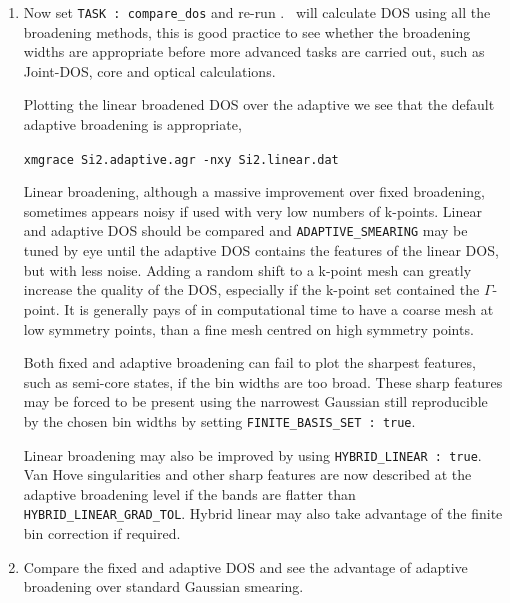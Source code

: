 \documentclass[a4paper,11pt,twoside]{book}
\begin{document}
{\begin{enumerate}
Increasing the number of integration points has improved the band energy of the adaptive smearing:
\begin{verbatim}
|          Band energy (Adaptive broadening) :       1.3623 eV         <- BEA |
\end{verbatim}


\item  Now set {\tt TASK : compare\_dos} and re-run \optados. \optados\ will calculate DOS using all the broadening methods, this is good practice to see whether the broadening widths are appropriate before more advanced tasks are carried out, such as Joint-DOS, core and optical calculations.

Plotting the linear broadened DOS over the adaptive we see that the default adaptive broadening is appropriate,

\verb#xmgrace Si2.adaptive.agr -nxy Si2.linear.dat#

Linear broadening, although a massive improvement over fixed broadening, sometimes appears noisy if used with very low numbers of k-points. Linear and adaptive DOS should be compared and \verb#ADAPTIVE_SMEARING# may be tuned by eye until the adaptive DOS contains the features of the linear DOS, but with less noise.  Adding a random shift to a k-point mesh can greatly increase the quality of the DOS, especially if the k-point set contained the $\Gamma$-point. It is generally pays of in computational time to have a coarse mesh at low symmetry points, than a fine mesh centred on high symmetry points. 

Both fixed and adaptive broadening can fail to plot the sharpest features, such as semi-core states, if the bin widths are too broad. These sharp features may be forced to be present using the narrowest Gaussian still reproducible by the chosen bin widths by setting \verb#FINITE_BASIS_SET : true#.  

Linear broadening may also be improved by using \verb#HYBRID_LINEAR : true#. Van Hove singularities and other sharp features are now described at the adaptive broadening level if the bands are flatter than \verb#HYBRID_LINEAR_GRAD_TOL#. Hybrid linear may also take advantage of the finite bin correction if required.

\item Compare the fixed and adaptive DOS and see the advantage of adaptive broadening over standard Gaussian smearing.

\end{enumerate}


}
\end{document}
